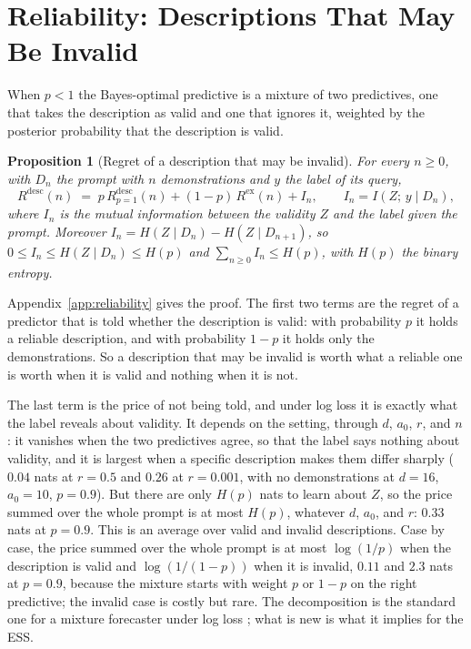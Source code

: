 \documentclass[10pt]{article}
\newtheorem{proposition}[theorem]{Proposition}
\begin{document}
\section{Reliability: Descriptions That May Be Invalid}\label{sec:reliability}
When $p < 1$ the Bayes-optimal predictive is a mixture of two predictives, one that takes the description as valid and one that ignores it, weighted by the posterior probability that the description is valid.

\begin{proposition}[Regret of a description that may be invalid]\label{prop:unreliable}
For every $n \ge 0$, with $D_n$ the prompt with $n$ demonstrations and $y$ the label of its query,
\begin{equation}\label{eq:decomp}
    R^{\mathrm{desc}}(n) \;=\; p\, R^{\mathrm{desc}}_{p=1}(n) + (1-p)\, R^{\mathrm{ex}}(n) + I_n, \qquad I_n = I(Z;\, y \mid D_n),
\end{equation}
where $I_n$ is the mutual information between the validity $Z$ and the label given the prompt. Moreover $I_n = H(Z \mid D_n) - H(Z \mid D_{n+1})$, so $0 \le I_n \le H(Z \mid D_n) \le H(p)$ and $\sum_{n \ge 0} I_n \le H(p)$, with $H(p)$ the binary entropy.
\end{proposition}
Appendix~\ref{app:reliability} gives the proof. The first two terms are the regret of a predictor that is told whether the description is valid: with probability $p$ it holds a reliable description, and with probability $1-p$ it holds only the demonstrations. So a description that may be invalid is worth what a reliable one is worth when it is valid and nothing when it is not.

The last term is the price of not being told, and under log loss it is exactly what the label reveals about validity. It depends on the setting, through $d$, $a_0$, $r$, and $n$: it vanishes when the two predictives agree, so that the label says nothing about validity, and it is largest when a specific description makes them differ sharply ($0.04$ nats at $r = 0.5$ and $0.26$ at $r = 0.001$, with no demonstrations at $d = 16$, $a_0 = 10$, $p = 0.9$). But there are only $H(p)$ nats to learn about $Z$, so the price summed over the whole prompt is at most $H(p)$, whatever $d$, $a_0$, and $r$: $0.33$ nats at $p = 0.9$. This is an average over valid and invalid descriptions. Case by case, the price summed over the whole prompt is at most $\log(1/p)$ when the description is valid and $\log(1/(1-p))$ when it is invalid, $0.11$ and $2.3$ nats at $p = 0.9$, because the mixture starts with weight $p$ or $1-p$ on the right predictive; the invalid case is costly but rare. The decomposition is the standard one for a mixture forecaster under log loss \citep{cesabianchi2006, merhav1998}; what is new is what it implies for the ESS.
\end{document}
